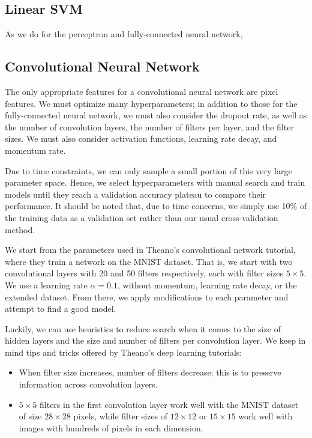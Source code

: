 \documentclass{acm_proc_article-sp}
\begin{document}
\subsection{Linear SVM}
As we do for the perceptron and fully-connected neural network, 


\subsection{Convolutional Neural Network}
The only appropriate features for a convolutional neural network are pixel features. We must optimize many hyperparameters; in addition to those for the fully-connected neural network, we must also consider the dropout rate, as well as the number of convolution layers, the number of filters per layer, and the filter sizes. We must also consider activation functions, learning rate decay, and momentum rate. 

Due to time constraints, we can only sample a small portion of this very large parameter space. Hence, we select hyperparameters with manual search and train models until they reach a validation accuracy plateau to compare their performance. It should be noted that, due to time concerns, we simply use 10\% of the training data as a validation set rather than our usual cross-validation method.

We start from the parameters used in Theano's convolutional network tutorial, where they train a network on the MNIST dataset. That is, we start with two convolutional layers with 20 and 50 filters respectively, each with filter sizes $5\times 5$. We use a learning rate $\alpha = 0.1$, without momentum, learning rate decay, or the extended dataset. From there, we apply modifications to each parameter and attempt to find a good model.

Luckily, we can use heuristics to reduce search when it comes to the size of hidden layers and the size and number of filters per convolution layer. We keep in mind tips and tricks offered by Theano's deep learning tutorials\cite{Theano-tut}:
\begin{itemize}
\item When filter size increases, number of filters decrease; this is to preserve information across convolution layers. 
\item $5 \times 5$ filters in the first convolution layer work well with the MNIST dataset of size $28 \times 28$ pixels, while filter sizes of $12\times12$ or $15\times15$ work well with images with hundreds of pixels in each dimension.
\end{itemize}
\end{document}
